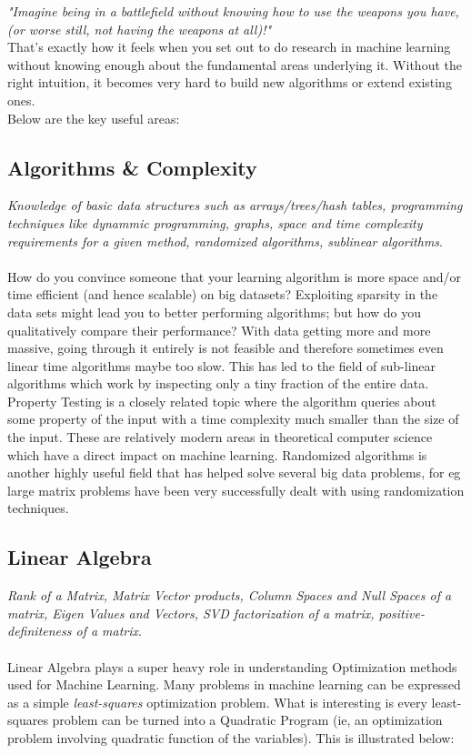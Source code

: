 \documentclass[a4paper]{article}
\begin{document}
\noindent \textit{"Imagine being in a battlefield without knowing how to use the weapons you have, (or worse still, not having the weapons at all)!"} \\

\noindent That's exactly how it feels when you set out to do research in machine learning without knowing enough about the fundamental areas underlying it. Without the right intuition, it becomes very hard to build new algorithms or extend existing ones.\\

\noindent Below are the key useful areas:

\subsection{Algorithms \& Complexity}
\textit{Knowledge of basic data structures such as arrays/trees/hash tables, programming techniques like dynammic programming, graphs, space and time complexity requirements for a given method, randomized algorithms, sublinear algorithms}.\\ \\
How do you convince someone that your learning algorithm is more space and/or time efficient (and hence scalable) on big datasets? Exploiting sparsity in the data sets might lead you to better performing algorithms; but how do you qualitatively compare their performance? With data getting more and more massive, going through it entirely is not feasible and therefore sometimes even linear time algorithms maybe too slow. This has led to the field of sub-linear algorithms which work by inspecting only a tiny fraction of the entire data. Property Testing is a closely related topic where the algorithm queries about some property of the input with a time complexity much smaller than the size of the input. These are relatively modern areas in theoretical computer science which have a direct impact on machine learning. Randomized algorithms is another highly useful field that has helped solve several big data problems, for eg large matrix problems have been very successfully dealt with using randomization techniques.\\

\subsection{Linear Algebra}
\textit{Rank of a Matrix, Matrix Vector products, Column Spaces and Null Spaces of a matrix, Eigen Values and Vectors, SVD factorization of a matrix, positive-definiteness of a matrix}. \\ \\
Linear Algebra plays a super heavy role in understanding Optimization methods used for Machine Learning. Many problems in machine learning can be expressed as a simple {\it least-squares} optimization problem. What is interesting is every least-squares problem can be turned into a Quadratic Program (ie, an optimization problem involving quadratic function of the variables). This is illustrated below:
\end{document}
